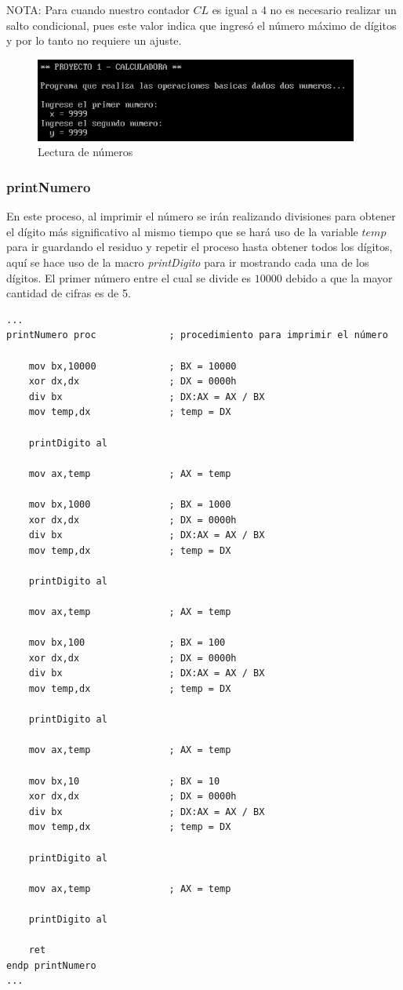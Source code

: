\documentclass[letter,12 pt,titlepage]{article}
\begin{document}
    NOTA: Para cuando nuestro contador $CL$ es igual a $4$ no es necesario realizar un salto condicional, pues este valor indica que ingresó el número máximo de dígitos y por lo tanto no requiere un ajuste.

    \begin{figure}[H]
    \centering
    \includegraphics[width=0.95\textwidth]{img/01.png}
    \caption{Lectura de números}
    \end{figure}

    \subsubsection{printNumero}

    En este proceso, al imprimir el número se irán realizando divisiones para obtener el dígito más significativo al mismo tiempo que se hará uso de la variable $temp$ para ir guardando el residuo y repetir el proceso hasta obtener todos los dígitos, aquí se hace uso de la macro \textit{printDigito} para ir mostrando cada una de los dígitos. El primer número entre el cual se divide es $10000$ debido a que la mayor cantidad de cifras es de 5.

\begin{verbatim}
...
printNumero proc             ; procedimiento para imprimir el número

    mov bx,10000             ; BX = 10000
    xor dx,dx                ; DX = 0000h
    div bx                   ; DX:AX = AX / BX
    mov temp,dx              ; temp = DX

    printDigito al

    mov ax,temp              ; AX = temp

    mov bx,1000              ; BX = 1000
    xor dx,dx                ; DX = 0000h
    div bx                   ; DX:AX = AX / BX
    mov temp,dx              ; temp = DX

    printDigito al

    mov ax,temp              ; AX = temp

    mov bx,100               ; BX = 100
    xor dx,dx                ; DX = 0000h
    div bx                   ; DX:AX = AX / BX
    mov temp,dx              ; temp = DX

    printDigito al

    mov ax,temp              ; AX = temp

    mov bx,10                ; BX = 10
    xor dx,dx                ; DX = 0000h
    div bx                   ; DX:AX = AX / BX
    mov temp,dx              ; temp = DX

    printDigito al

    mov ax,temp              ; AX = temp

    printDigito al

    ret
endp printNumero
...
\end{verbatim}
\end{document}
